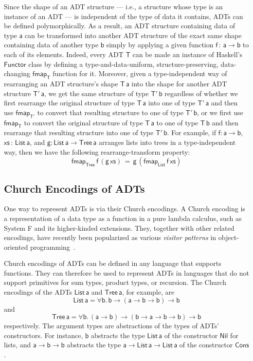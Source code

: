 \documentclass[acmsmall,screen,review,anonymous]{acmart}
\theoremstyle{definition}
\begin{document}
Since the shape of an ADT structure --- i.e., a structure whose type
is an instance of an ADT --- is independent of the type of data it
contains, ADTs can be defined polymorphically. As a result, an ADT
structure containing data of type $\mathsf{a}$ can be transformed into
another ADT structure of the exact same shape containing data of
another type $\mathsf{b}$ simply by applying a given function
$\mathsf{f \,:\,a \to b}$ to each of its elements. Indeed, every ADT
$\mathsf{T}$ can be made an instance of Haskell's $\mathsf{Functor}$
class by defining a type-and-data-uniform, structure-preserving,
data-changing $\mathsf{fmap_T}$ function for it.  Moreover, given a
type-independent way of rearranging an ADT structure's shape
$\mathsf{T\,a}$ into the shape for another ADT structure
$\mathsf{T'\,a}$, we get the same structure of type $\mathsf{T'\,b}$
regardless of whether we first rearrange the original structure of
type $\mathsf{T\,a}$ into one of type $\mathsf{T'\,a}$ and then use
$\mathsf{fmap_{T'}}$ to convert that resulting structure to one of
type $\mathsf{T'\,b}$, or we first use $\mathsf{fmap_T}$ to convert
the original structure of type $\mathsf{T\,a}$ to one of type
$\mathsf{T\,b}$ and then rearrange that resulting structure into one
of type $\mathsf{T'\,b}$. For example, if $\mathsf{f : a \to b}$,
$\mathsf{xs \,:\,List\,a}$, and $\mathsf{g : List\,a\to Tree\,a}$
arranges lists into trees in a type-independent way, then we have the
following rearrange-transform property:
\[\mathsf{fmap_{Tree}\,f\,(g \, xs) \,=\, g\,(fmap_{List}\,f\,xs)}\]

\subsection{Church Encodings of ADTs}

One way to represent ADTs is via their Church encodings. A Church
encoding is a representation of a data type as a function in a pure
lambda calculus, such as System F and its higher-kinded
extensions. They, together with other related encodings, have recently
been popularized as various {\em visitor patterns} in object-oriented
programming~\cite{owg08,gon21}.

Church encodings of ADTs can be defined in any language that supports
functions. They can therefore be used to represent ADTs in languages
that do not support primitives for sum types, product types, or
recursion. The Church encodings of the ADTs $\mathsf{List\,a}$ and
$\mathsf{Tree\,a}$, for example, are
\[\mathsf{List\,a} = \mathsf{\forall b.\,b \to (a \to b \to b) \to b}\]
and 
\[\mathsf{Tree\,a} = \mathsf{\forall b.\,(a \to b) \to (b \to a \to b
  \to b) \to b}\] respectively. The argument types are abstractions of
the types of ADTs' constructors. For instance, $\mathsf{b}$ abstracts
the type $\mathsf{List\,a}$ of the constructor $\mathsf{Nil}$ for
lists, and $\mathsf{a \to b \to b}$ abstracts the type $\mathsf{a \to
  List\,a \to List\,a}$ of the constructor $\mathsf{Cons}$.
\end{document}
